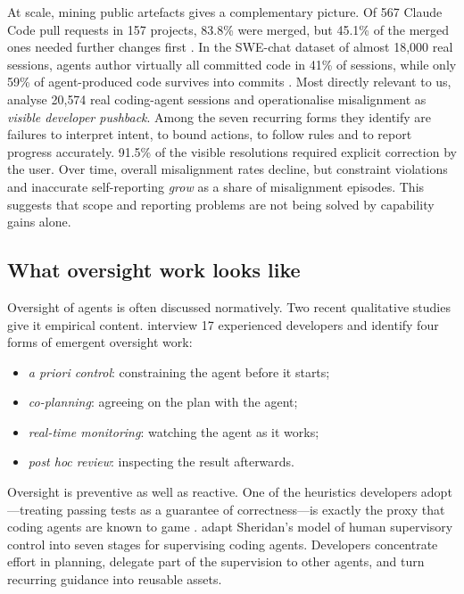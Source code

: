 At scale, mining public artefacts gives a complementary picture. Of 567 Claude Code pull requests in
157 projects, 83.8\% were merged, but 45.1\% of the merged ones needed further changes first
\citep{watanabe2025agentic}. In the SWE-chat dataset of almost 18{,}000 real sessions, agents author
virtually all committed code in 41\% of sessions, while only 59\% of agent-produced code survives into
commits \citep{baumann2026swechat}. Most directly relevant to us, \citet{tang2026fail} analyse 20{,}574
real coding-agent sessions and operationalise misalignment as \emph{visible developer pushback}.
Among the seven recurring forms they identify are failures to interpret intent, to bound actions,
to follow rules and to report progress accurately. 91.5\% of the visible resolutions required
explicit correction by the user. Over time, overall misalignment rates decline, but constraint
violations and inaccurate self-reporting \emph{grow} as a share of misalignment episodes. This
suggests that scope and reporting problems are not being solved by capability gains alone.

\subsection{What oversight work looks like}

Oversight of agents is often discussed normatively. Two recent qualitative studies give it empirical
content. \citet{dhanorkar2026oversight} interview 17 experienced developers and identify four forms of
emergent oversight work:
\begin{itemize}
  \item \emph{a priori control}: constraining the agent before it starts;
  \item \emph{co-planning}: agreeing on the plan with the agent;
  \item \emph{real-time monitoring}: watching the agent as it works;
  \item \emph{post hoc review}: inspecting the result afterwards.
\end{itemize}
Oversight is preventive as well as reactive. One of the heuristics developers adopt---treating
passing tests as a guarantee of correctness---is exactly the proxy that coding agents are known to
game \citep{zhong2025impossiblebench}. \citet{park2026delegation} adapt Sheridan's model of human
supervisory control into seven stages for supervising coding agents. Developers concentrate effort
in planning, delegate part of the supervision to other agents, and turn recurring guidance into
reusable assets.

